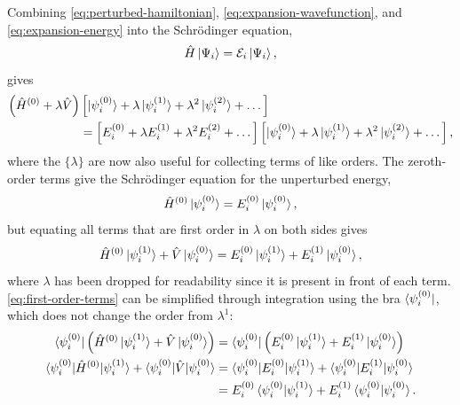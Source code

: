 \documentclass[%
class = book,%
crop = false,%
float = true,%
multi = true,%
preview = false,%
]{standalone}
\newcommand\schrod{Schr{\"{o}}dinger}
\begin{document}
Combining \eqref{eq:perturbed-hamiltonian}, \eqref{eq:expansion-wavefunction}, and \eqref{eq:expansion-energy} into the \schrod{} equation,
\begin{equation}
  \label{eq:schrodinger-equation}
  \hat{H}\ket{\Psi_{i}} = \mathcal{E}_{i}\ket{\Psi_{i}},
\end{equation}
gives
\begin{equation}
  \label{eq:expansion-schrodinger}
  \begin{aligned}
    \left( \hat{H}^{(0)} + \lambda\hat{V} \right) &\left[ \ket{\psi_{i}^{(0)}} + \lambda\ket{\psi_{i}^{(1)}} + \lambda^{2}\ket{\psi_{i}^{(2)}} + \dots \right] \\
    &= \left[ E_{i}^{(0)} + \lambda E_{i}^{(1)} + \lambda^{2} E_{i}^{(2)} + \dots \right] \left[ \ket{\psi_{i}^{(0)}} + \lambda\ket{\psi_{i}^{(1)}} + \lambda^{2}\ket{\psi_{i}^{(2)}} + \dots \right],
  \end{aligned}
\end{equation}
where the \(\{\lambda\}\) are now also useful for collecting terms of like orders. The zeroth-order terms give the \schrod{} equation for the unperturbed energy,
\begin{equation}
  \label{eq:unperturbed-energy}
  \hat{H}^{(0)} \ket{\psi_{i}^{(0)}} = E_{i}^{(0)} \ket{\psi_{i}^{(0)}},
\end{equation}
but equating all terms that are first order in \(\lambda\) on both sides gives
\begin{equation}
  \label{eq:first-order-terms}
  \hat{H}^{(0)} \ket{\psi_{i}^{(1)}} + \hat{V} \ket{\psi_{i}^{(0)}} = E_{i}^{(0)} \ket{\psi_{i}^{(1)}} + E_{i}^{(1)} \ket{\psi_{i}^{(0)}},
\end{equation}
where \(\lambda\) has been dropped for readability since it is present in front of each term. \eqref{eq:first-order-terms} can be simplified through integration using the bra \(\bra{\psi_{i}^{(0)}}\), which does not change the order from \(\lambda^{1}\):
\begin{equation}
  \label{eq:first-order-terms-bra}
  \begin{aligned}
    \bra{\psi_{i}^{(0)}} \left( \hat{H}^{(0)} \ket{\psi_{i}^{(1)}} + \hat{V} \ket{\psi_{i}^{(0)}} \right) &= \bra{\psi_{i}^{(0)}} \left( E_{i}^{(0)} \ket{\psi_{i}^{(1)}} + E_{i}^{(1)} \ket{\psi_{i}^{(0)}} \right) \\
    \braket{\psi_{i}^{(0)} | \hat{H}^{(0)} | \psi_{i}^{(1)}} + \braket{\psi_{i}^{(0)} | \hat{V} | \psi_{i}^{(0)}} &= \braket{\psi_{i}^{(0)} | E_{i}^{(0)} | \psi_{i}^{(1)}} + \braket{\psi_{i}^{(0)} | E_{i}^{(1)} | \psi_{i}^{(0)}} \\
    &= E_{i}^{(0)} \braket{\psi_{i}^{(0)} | \psi_{i}^{(1)}} + E_{i}^{(1)} \braket{\psi_{i}^{(0)} | \psi_{i}^{(0)}}.
  \end{aligned}
\end{equation}
\end{document}
